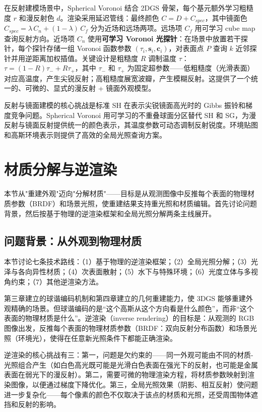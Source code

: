 在反射建模场景中，Spherical Voronoi 结合 2DGS 骨架，每个基元额外学习粗糙度 $r$ 和漫反射色 $d$。渲染采用延迟管线：最终颜色 $C = D + C_{spec}$，其中镜面色 $C_{spec} = \lambda \, C_n + (1-\lambda) \, C_f$ 分为近场和远场两项。远场项 $C_f$ 用可学习 cube map 查询反射方向。近场项 $C_n$ 使用\textbf{可学习 Voronoi 光探针}：在场景中放置若干探针，每个探针存储一组 Voronoi 函数参数 $(\tau_i, \mathbf{s}_i, \mathbf{c}_i)$，对表面点 $P$ 查询 $k$ 近邻探针并用逆距离加权插值。关键设计是粗糙度 $R$ 调制温度 $\tau$：$\tau = (1-R)\tau_- + R\tau_+$，其中 $\tau_-$ 和 $\tau_+$ 为固定超参数——低粗糙度（光滑表面）对应高温度，产生尖锐反射；高粗糙度展宽波瓣，产生模糊反射。这提供了一个统一的、可微的、显式的漫反射 + 镜面外观模型。

\begin{takeaway}
反射与镜面建模的核心挑战是标准 SH 在表示尖锐镜面高光时的 Gibbs 振铃和梯度竞争问题。Spherical Voronoi 用可学习的不重叠球面分区替代 SH 和 SG，为漫反射与镜面反射提供统一的颜色表示，其温度参数可动态调制反射锐度。环境贴图和高斯环境表示则提供了高效的全局光照查询方案。
\end{takeaway}



\section{材质分解与逆渲染}
\label{sec:05_2}

本节从"重建外观"迈向"分解材质"——目标是从观测图像中反推每个表面的物理材质参数（BRDF）和场景光照，使重建结果支持重光照和材质编辑。首先讨论问题背景，然后按基于物理的逆渲染框架和全局光照分解两条主线展开。

\subsection{问题背景：从外观到物理材质}

本节讨论七条技术路线：（1）基于物理的逆渲染框架；（2）全局光照分解；（3）光泽与各向异性材质；（4）次表面散射；（5）水下与特殊环境；（6）光度立体与多视角约束；（7）其他逆渲染方法。

第三章建立的球谐编码机制和第四章建立的几何重建能力，使 3DGS 能够重建外观精确的场景。但球谐编码的是“这个高斯从这个方向看是什么颜色”，而非“这个表面的物理材质是什么”。逆渲染（inverse rendering）的目标是：从观测的 RGB 图像出发，反推每个表面的物理材质参数（BRDF：双向反射分布函数）和场景光照（环境光），使得在任意新光照条件下都能正确渲染。

逆渲染的核心挑战有三：第一，问题是欠约束的——同一外观可能由不同的材质-光照组合产生（如白色高光既可能是光滑白色表面在强光下的反射，也可能是金属表面在弱光下的漫反射）。第二，需要可微的物理渲染方程，将材质参数映射到渲染图像，以便通过梯度下降优化。第三，全局光照效果（阴影、相互反射）使问题进一步复杂化——每个像素的颜色不仅取决于该点的材质和光照，还受周围物体遮挡和反射的影响。

